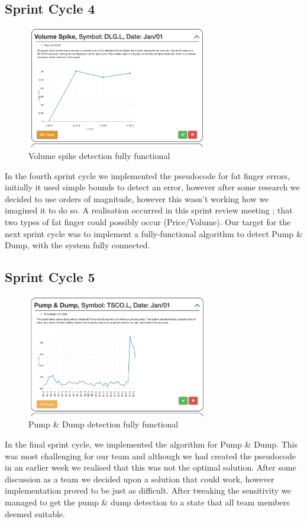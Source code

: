 \documentclass[12pt]{article}
\begin{document}
  \subsection{Sprint Cycle 4}
  \begin{figure}[H]
  \centering
  \includegraphics[width=80mm]{sprint4.png}
  \caption{Volume spike detection fully functional}
  \end{figure}
  In the fourth sprint cycle we implemented the pseudocode for fat finger errors, initially it used simple bounds to detect an error,
  however after some research  we decided to use orders of magnitude, however this wasn’t working how we imagined it to do so.
  A realisation occurred in this sprint review meeting ; that two types of fat finger could possibly occur (Price/Volume).
  Our target for the next sprint cycle was to implement a fully-functional algorithm to detect Pump \& Dump, with the system fully connected.
  \subsection{Sprint Cycle 5}
  \begin{figure}[H]
  \centering
  \includegraphics[width=80mm]{sprint5.png}
  \caption{Pump \& Dump detection fully functional}
  \end{figure}
  In the final sprint cycle, we implemented the algorithm for Pump \& Dump.
  This was most challenging for our team and although we had created the pseudocode in an earlier week we realised that this was not the optimal solution.
  After some discussion as a team we decided upon a solution that could work, however implementation proved to be just as difficult.
  After tweaking the sensitivity we managed to get the pump \& dump detection to a state that all team members deemed suitable.
\end{document}
